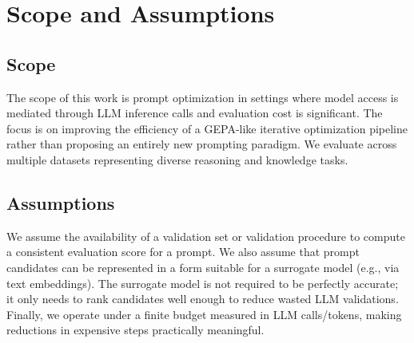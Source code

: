 \section{Scope and Assumptions}
\subsection{Scope}
The scope of this work is prompt optimization in settings where model access is mediated through LLM inference calls and evaluation cost is significant. The focus is on improving the efficiency of a GEPA-like iterative optimization pipeline rather than proposing an entirely new prompting paradigm. We evaluate across multiple datasets representing diverse reasoning and knowledge tasks.

\subsection{Assumptions}
We assume the availability of a validation set or validation procedure to compute a consistent evaluation score for a prompt. We also assume that prompt candidates can be represented in a form suitable for a surrogate model (e.g., via text embeddings). The surrogate model is not required to be perfectly accurate; it only needs to rank candidates well enough to reduce wasted LLM validations. Finally, we operate under a finite budget measured in LLM calls/tokens, making reductions in expensive steps practically meaningful.
